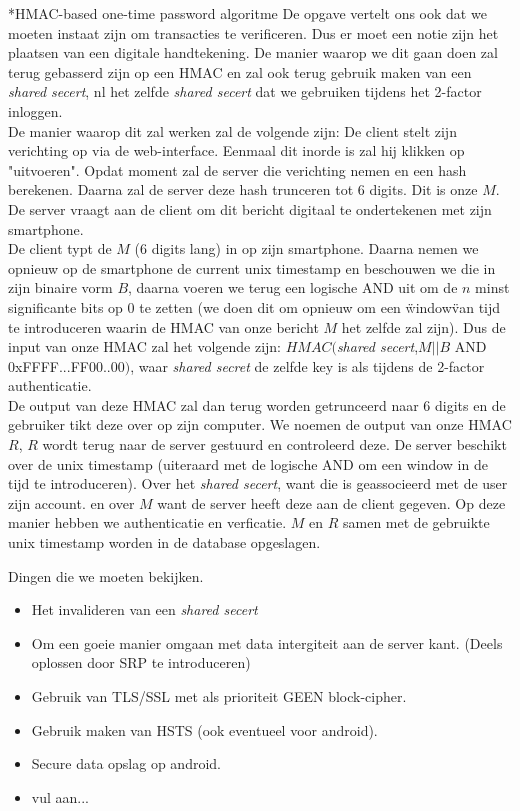 \documentclass[10pt,a4paper]{report}
\begin{document}
\begin{section}*{HMAC-based one-time password algoritme}
De opgave vertelt ons ook dat we moeten instaat zijn om transacties te verificeren. Dus er moet een notie zijn het plaatsen van een digitale handtekening. De manier waarop we dit gaan doen zal terug gebasserd zijn op een HMAC en zal ook terug gebruik maken van een \emph{shared secert}, nl het zelfde \emph{shared secert} dat we gebruiken tijdens het 2-factor inloggen.\\

De manier waarop dit zal werken zal de volgende zijn:
De client stelt zijn verichting op via de web-interface. Eenmaal dit inorde is zal hij klikken op "uitvoeren". Opdat moment zal de server die verichting nemen en een hash berekenen. Daarna zal de server deze hash trunceren tot 6 digits. Dit is onze $M$. De server vraagt aan de client om dit bericht digitaal te ondertekenen met zijn smartphone. \\
De client typt de $M$ (6 digits lang) in op zijn smartphone. Daarna nemen we opnieuw op de smartphone de current unix timestamp en beschouwen we die in zijn binaire vorm $B$, daarna voeren we terug een logische AND uit om de $n$ minst significante bits op 0 te zetten (we doen dit om opnieuw om een \"window\" van tijd te introduceren waarin de HMAC van onze bericht $M$ het zelfde zal zijn). Dus de input van onze HMAC zal het volgende zijn: $HMAC($\emph{shared secert},$M||B$ AND 0xFFFF...FF00..00$)$, waar \emph{shared secret} de zelfde key is als tijdens de 2-factor authenticatie. \\
De output van deze HMAC zal dan terug worden getrunceerd naar 6 digits en de gebruiker tikt deze over op zijn computer. We noemen de output van onze HMAC $R$, $R$ wordt terug naar de server gestuurd en controleerd deze. De server beschikt over de unix timestamp (uiteraard met de logische AND om een window in de tijd te introduceren). Over het \emph{shared secert}, want die is geassocieerd met de user zijn account. en over $M$ want de server heeft deze aan de client gegeven. Op deze manier hebben we authenticatie en verficatie. $M$ en $R$ samen met de gebruikte unix timestamp worden in de database opgeslagen. 
\end{section} 
\begin{subsection}
Dingen die we moeten bekijken.
\begin{itemize}
\item Het invalideren van een \emph{shared secert}
\item Om een goeie manier omgaan met data intergiteit aan de server kant. (Deels oplossen door SRP te introduceren)
\item Gebruik van TLS/SSL met als prioriteit GEEN block-cipher.
\item Gebruik maken van HSTS (ook eventueel voor android).
\item Secure data opslag op android.
\item vul aan...
\end{itemize}
\end{subsection}
\end{document}
